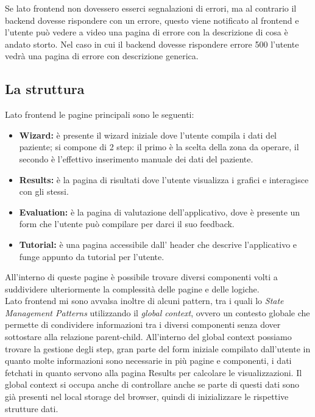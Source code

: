 \noindent Se lato frontend non dovessero esserci segnalazioni di errori, ma al contrario il backend dovesse rispondere con un errore, questo viene notificato al frontend e l'utente può vedere a video una pagina di errore con la descrizione di cosa è andato storto. Nel caso in cui il backend dovesse rispondere errore 500 l'utente vedrà una pagina di errore con descrizione generica. 

\subsection{La struttura}
Lato frontend le pagine principali sono le seguenti:\\ 
\begin{itemize}
    \item \textbf{Wizard:} è presente il wizard iniziale dove l'utente compila i dati del paziente; si compone di 2 step:  il primo è la scelta della zona da operare, il secondo è l'effettivo inserimento manuale dei dati del paziente.
    \item \textbf{Results:} è la pagina di risultati dove l'utente visualizza i grafici e interagisce con gli stessi.
    \item \textbf{Evaluation:} è la pagina di valutazione dell'applicativo, dove è presente un form che l'utente può compilare per darci il suo feedback. 
    \item \textbf{Tutorial:} è una pagina accessibile dall' header che descrive l'applicativo e funge appunto da tutorial per l'utente. 
\end{itemize}
All'interno di queste pagine è possibile trovare diversi componenti volti a suddividere ulteriormente la complessità delle pagine e delle logiche.\\ 

Lato frontend mi sono avvalsa inoltre di alcuni pattern, tra i quali lo \textit{State Management Patterns} utilizzando il \textit{global context}, ovvero un contesto globale che permette di condividere informazioni tra i diversi componenti senza dover sottostare alla relazione parent-child. All'interno del global context possiamo trovare la gestione degli step, gran parte del form iniziale compilato dall'utente in quanto molte informazioni sono necessarie in più pagine e componenti, i dati fetchati in quanto servono alla pagina Results per calcolare le visualizzazioni. Il global context si occupa anche di controllare anche se parte di questi dati sono già presenti nel local storage del browser, quindi di inizializzare le rispettive strutture dati.\\

